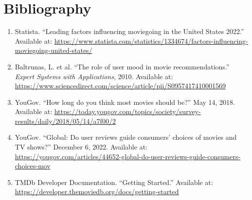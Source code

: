\documentclass[11pt]{article}
\begin{document}
\clearpage
\section*{Bibliography}
\begin{enumerate}
  \item Statista. ``Leading factors influencing moviegoing in the United States 2022.'' Available at: \url{https://www.statista.com/statistics/1334674/factors-influencing-moviegoing-united-states/}
  \item Baltrunas, L. et al. ``The role of user mood in movie recommendations.'' \textit{Expert Systems with Applications}, 2010. Available at: \url{https://www.sciencedirect.com/science/article/pii/S0957417410001569}
  \item YouGov. ``How long do you think most movies should be?'' May 14, 2018. Available at: \url{https://today.yougov.com/topics/society/survey-results/daily/2018/05/14/a7f00/2}
  \item YouGov. ``Global: Do user reviews guide consumers' choices of movies and TV shows?'' December 6, 2022. Available at: \url{https://yougov.com/articles/44652-global-do-user-reviews-guide-consumers-choices-mov}
  \item TMDb Developer Documentation. ``Getting Started.'' Available at: \url{https://developer.themoviedb.org/docs/getting-started}
\end{enumerate}
\end{document}
